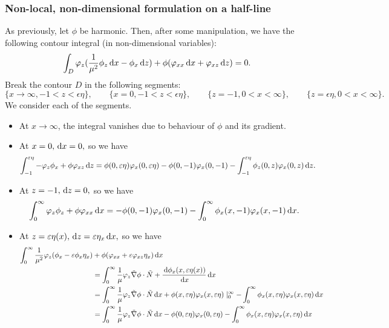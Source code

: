 \documentclass[10pt,reqno,oneside,a4paper]{article}
\begin{document}
\subsubsection{Non-local, non-dimensional formulation on a half-line}
As previously, let $\phi$ be harmonic. Then, after some manipulation, we have the following contour integral (in non-dimensional variables):
\begin{equation}\label{contourHL1}
\int_D \varphi_z(\frac{1}{\mu^2}\phi_z \,\mathrm{d} x - \phi_x \,\mathrm{d} z) + \phi(\varphi_{xx} \,\mathrm{d} x + \varphi_{xz} \,\mathrm{d} z) = 0.
\end{equation}
Break the contour $D$ in the following segments:
\[ 
\{ x \to \infty, - 1 < z < \epsilon \eta\}, \qquad \{ x = 0, -1 < z < \epsilon\eta\}, \qquad \{ z = -1, 0<x<\infty\}, \qquad \{ z = \epsilon\eta, 0<x<\infty\}.
\]
We consider each of the segments.
\begin{itemize}
\item At $x \to \infty$, the integral vanishes due to behaviour of $\phi$ and its gradient. 
\item At $x = 0, \,\mathrm{d} x = 0,$ so we have 
\begin{align*}
\int_{-1}^{\varepsilon\eta} - \varphi_z \phi_x + \phi \varphi_{xz} \,\mathrm{d} z &= \phi(0, \varepsilon \eta) \varphi_x(0, \varepsilon\eta) - \phi(0, -1) \varphi_x(0, -1) - \int_{-1}^{\varepsilon\eta} \phi_{z}(0,z) \varphi_{x}(0,z) \,\mathrm{d} z. 
\end{align*} 
\item At $z = -1, \,\mathrm{d} z = 0,$ so we have 
\begin{align*}
\int^{\infty}_{0} \varphi_z \phi_z + \phi \varphi_{xx} \,\mathrm{d} x = - \phi(0,-1) \varphi_{x}(0,-1) - \int^{\infty}_{0} \phi_x(x,-1) \varphi_x(x,-1) \,\mathrm{d} x.
\end{align*}
\item At $z =\varepsilon \eta(x), \,\mathrm{d} z = \varepsilon\eta_x \,\mathrm{d} x,$ so we have
\begin{align*}
\int_{0}^{\infty} \frac{1}{\mu^2} \varphi_z(\phi_x - \varepsilon\phi_x \eta_x) &+ \phi(\varphi_{xx}  + \varepsilon \varphi_{xz}\eta_x) \,\mathrm{d} x \\
&=\int_{0}^{\infty} \frac{1}{\mu} \varphi_z \tilde{\nabla} \phi \cdot \tilde{N}+ \frac{\,\mathrm{d} \phi_x(x, \varepsilon \eta(x))}{\,\mathrm{d} x} \,\mathrm{d} x \\
&= \int_{0}^{\infty} \frac{1}{\mu} \varphi_z \tilde{\nabla} \phi\cdot \tilde{N} \,\mathrm{d} x + \phi(x, \varepsilon \eta) \varphi_x(x, \varepsilon\eta) \mid^{\infty}_{0} - \int^{\infty}_{0}\phi_x(x, \varepsilon\eta)  \varphi_x(x, \varepsilon \eta) \,\mathrm{d} x \\
&= \int_{0}^{\infty} \frac{1}{\mu} \varphi_z \tilde{\nabla} \phi \cdot \tilde{N} \,\mathrm{d} x - \phi(0, \varepsilon \eta) \varphi_x(0, \varepsilon\eta) - \int^{\infty}_{0}\phi_x(x, \varepsilon\eta)  \varphi_x(x, \varepsilon \eta) \,\mathrm{d} x 
\end{align*}
 \end{itemize}
\end{document}
